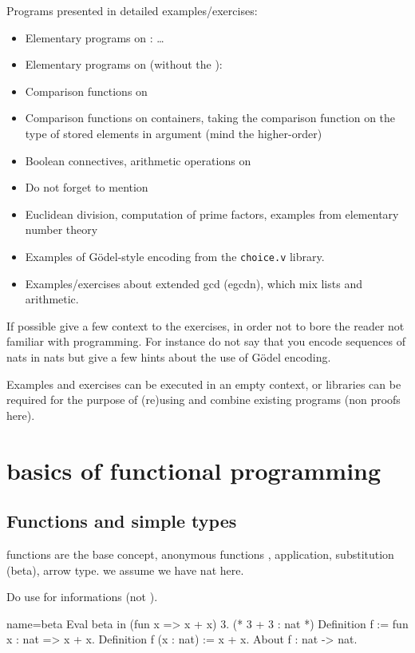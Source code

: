 Programs presented in detailed examples/exercises:
\begin{itemize}
\item Elementary programs on : \dots
\item Elementary programs on  (without the ):
\item Comparison functions on 
\item Comparison functions on containers, taking the comparison
  function on the type of stored elements in argument (mind the
  higher-order)
\item Boolean connectives, arithmetic operations on 
\item Do not forget to mention 
\item Euclidean division, computation of prime factors, examples from
  elementary number theory
\item Examples of G{\"o}del-style encoding from the {\tt choice.v} library.
\item Examples/exercises about extended gcd (egcdn), which mix lists
  and arithmetic.
\end{itemize}
If possible give a few context to the exercises, in order not to bore
the reader not familiar with programming. For instance do not say that
you encode sequences of nats in nats but give a few hints about the
use of G{\"o}del encoding.

Examples and exercises can be executed in an empty context, or
libraries can be required for the purpose of (re)using and combine existing
programs (non proofs here).
\section{basics of functional programming}

\subsection{Functions and simple types}
functions are the base concept,
anonymous functions ,
application,
substitution (beta), arrow type.
we assume we have nat here.

Do use  for informations (not ).
\begin{coq}{name=beta}{}
Eval beta in (fun x => x + x) 3. (* 3 + 3 : nat *)
Definition f := fun x : nat => x + x.
Definition f (x : nat) := x + x.
About f : nat -> nat.
\end{coq}

